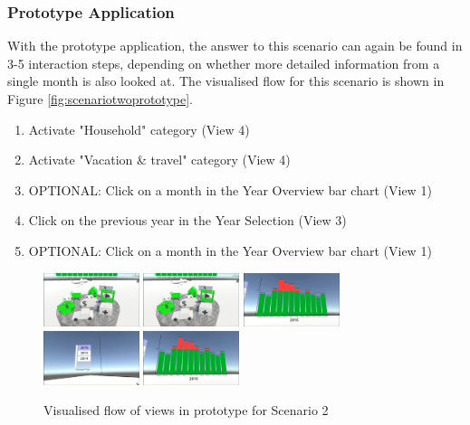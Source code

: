
\subsubsection{Prototype Application}

With the prototype application, the answer to this scenario can again be found in 3-5 interaction steps, depending on whether more detailed information from a single month is also looked at. The visualised flow for this scenario is shown in Figure \ref{fig:scenariotwoprototype}.
\begin{enumerate}
	\item Activate "Household" category (View 4)
	\item Activate "Vacation \& travel" category (View 4)
	\item OPTIONAL: Click on a month in the Year Overview bar chart (View 1)
	\item Click on the previous year in the Year Selection (View 3)
	\item OPTIONAL: Click on a month in the Year Overview bar chart (View 1)
\end{enumerate}
\begin{figure}[h]
	\begin{center}
		\includegraphics[width=2.8cm]{03_Figures/08_Development/View4_CategoriesFiltering.png}
		\includegraphics[width=2.8cm]{03_Figures/08_Development/View4_CategoriesFiltering.png}
		\includegraphics[width=2.8cm]{03_Figures/08_Development/View1_YearOverview.png}
		\includegraphics[width=2.8cm]{03_Figures/08_Development/View3_YearSelection.png}
		\includegraphics[width=2.8cm]{03_Figures/08_Development/View1_YearOverview.png}
		\caption{Visualised flow of views in prototype for Scenario 2}
		\label{fig:scenariotwoeprototype}
	\end{center}
\end{figure}

